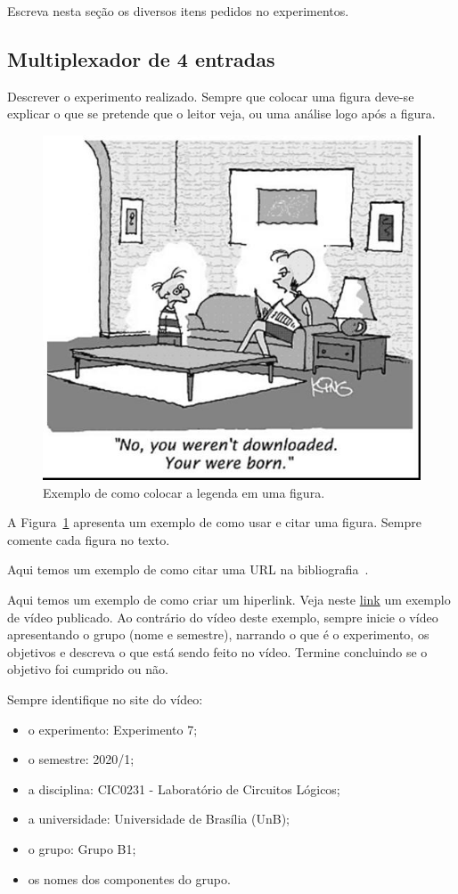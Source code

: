 \documentclass[12pt]{article}
\begin{document}
Escreva nesta seção os diversos itens pedidos no experimentos.

\subsection{Multiplexador de 4 entradas}
\label{sec:Mux}

Descrever o experimento realizado. Sempre  que colocar uma figura deve-se explicar o que se pretende que o leitor veja, ou uma análise logo após a figura. 

\begin{figure}[H]
    \centering
    \includegraphics[width=.5\textwidth]{fig1.jpg}
    \caption{Exemplo de como colocar a legenda em uma figura.}
    \label{fig:exemplo}
\end{figure}

A Figura~\ref{fig:exemplo} apresenta um exemplo de como usar e citar uma figura. Sempre comente cada figura no texto.

Aqui temos um exemplo de como citar uma URL na bibliografia~\cite{systemverilog}.

Aqui temos um exemplo de como criar um hiperlink. Veja neste
\href{https://www.youtube.com/watch?v=itWbXy0Qzw0}{link} um exemplo de vídeo publicado. Ao contrário do vídeo deste exemplo, sempre inicie o vídeo apresentando o grupo (nome e semestre), narrando o que é o experimento, os objetivos e descreva o que está sendo feito no vídeo. Termine concluindo se o objetivo foi cumprido ou não.

Sempre identifique no site do vídeo:
\begin{itemize}
    \item o experimento: Experimento 7;
    \item o semestre: 2020/1;
    \item a disciplina: CIC0231 - Laboratório de Circuitos Lógicos;
    \item a universidade: Universidade de Brasília (UnB);
    \item o grupo: Grupo B1;
    \item os nomes dos componentes do grupo.
\end{itemize}
\end{document}
